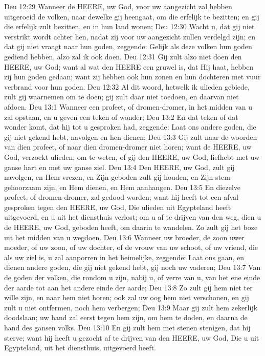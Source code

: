 Deu 12:29  Wanneer de HEERE, uw God, voor uw aangezicht zal hebben uitgeroeid de volken, naar dewelke gij heengaat, om die erfelijk te bezitten; en gij die erfelijk zult bezitten, en in hun land wonen;
Deu 12:30  Wacht u, dat gij niet verstrikt wordt achter hen, nadat zij voor uw aangezicht zullen verdelgd zijn; en dat gij niet vraagt naar hun goden, zeggende: Gelijk als deze volken hun goden gediend hebben, alzo zal ik ook doen.
Deu 12:31  Gij zult alzo niet doen den HEERE, uw God; want al wat den HEERE een gruwel is, dat Hij haat, hebben zij hun goden gedaan; want zij hebben ook hun zonen en hun dochteren met vuur verbrand voor hun goden.
Deu 12:32  Al dit woord, hetwelk ik ulieden gebiede, zult gij waarnemen om te doen; gij zult daar niet toedoen, en daarvan niet afdoen.
Deu 13:1  Wanneer een profeet, of dromen-dromer, in het midden van u zal opstaan, en u geven een teken of wonder;
Deu 13:2  En dat teken of dat wonder komt, dat hij tot u gesproken had, zeggende: Laat ons andere goden, die gij niet gekend hebt, navolgen en hen dienen;
Deu 13:3  Gij zult naar de woorden van dien profeet, of naar dien dromen-dromer niet horen; want de HEERE, uw God, verzoekt ulieden, om te weten, of gij den HEERE, uw God, liefhebt met uw ganse hart en met uw ganse ziel.
Deu 13:4  Den HEERE, uw God, zult gij navolgen, en Hem vrezen, en Zijn geboden zult gij houden, en Zijn stem gehoorzaam zijn, en Hem dienen, en Hem aanhangen.
Deu 13:5  En diezelve profeet, of dromen-dromer, zal gedood worden; want hij heeft tot een afval gesproken tegen den HEERE, uw God, Die ulieden uit Egypteland heeft uitgevoerd, en u uit het diensthuis verlost; om u af te drijven van den weg, dien u de HEERE, uw God, geboden heeft, om daarin te wandelen. Zo zult gij het boze uit het midden van u wegdoen.
Deu 13:6  Wanneer uw broeder, de zoon uwer moeder, of uw zoon, of uw dochter, of de vrouw van uw schoot, of uw vriend, die als uw ziel is, u zal aanporren in het heimelijke, zeggende: Laat ons gaan, en dienen andere goden, die gij niet gekend hebt, gij noch uw vaderen;
Deu 13:7  Van de goden der volken, die rondom u zijn, nabij u, of verre van u, van het ene einde der aarde tot aan het andere einde der aarde;
Deu 13:8  Zo zult gij hem niet ter wille zijn, en naar hem niet horen; ook zal uw oog hem niet verschonen, en gij zult u niet ontfermen, noch hem verbergen;
Deu 13:9  Maar gij zult hem zekerlijk doodslaan; uw hand zal eerst tegen hem zijn, om hem te doden, en daarna de hand des gansen volks.
Deu 13:10  En gij zult hem met stenen stenigen, dat hij sterve; want hij heeft u gezocht af te drijven van den HEERE, uw God, Die u uit Egypteland, uit het diensthuis, uitgevoerd heeft.
